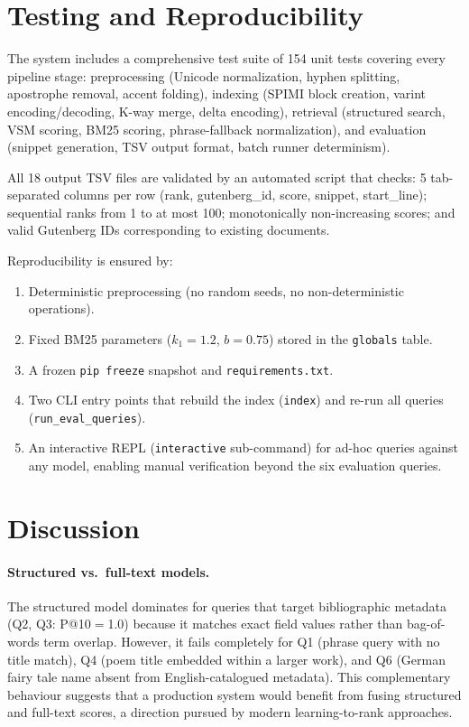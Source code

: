 \documentclass[sigconf,nonacm]{acmart}
\begin{document}
\section{Testing and Reproducibility}

The system includes a comprehensive test suite of 154 unit tests covering
every pipeline stage: preprocessing (Unicode normalization, hyphen splitting,
apostrophe removal, accent folding), indexing (SPIMI block creation, varint
encoding/decoding, K-way merge, delta encoding), retrieval (structured search,
VSM scoring, BM25 scoring, phrase-fallback normalization), and evaluation
(snippet generation, TSV output format, batch runner determinism).

All 18 output TSV files are validated by an automated script that checks:
5 tab-separated columns per row (rank, gutenberg\_id, score, snippet,
start\_line); sequential ranks from 1 to at most 100; monotonically
non-increasing scores; and valid Gutenberg IDs corresponding to existing
documents.

Reproducibility is ensured by:
\begin{enumerate}[nosep]
  \item Deterministic preprocessing (no random seeds, no non-deterministic
        operations).
  \item Fixed BM25 parameters ($k_1{=}1.2$, $b{=}0.75$) stored in
        the \texttt{globals} table.
  \item A frozen \texttt{pip~freeze} snapshot and
        \texttt{requirements.txt}.
  \item Two CLI entry points that rebuild the index
        (\texttt{index}) and re-run all queries
        (\texttt{run\_eval\_queries}).
  \item An interactive REPL (\texttt{interactive} sub-command)
        for ad-hoc queries against any model, enabling manual
        verification beyond the six evaluation queries.
\end{enumerate}

\section{Discussion}

\paragraph{Structured vs.\ full-text models.}
The structured model dominates for queries that target bibliographic metadata
(Q2, Q3: P@10$=$1.0) because it matches exact field values rather than
bag-of-words term overlap.  However, it fails completely for Q1 (phrase query
with no title match), Q4 (poem title embedded within a larger work), and Q6
(German fairy tale name absent from English-catalogued metadata).  This
complementary behaviour suggests that a production system would benefit from
fusing structured and full-text scores, a direction pursued by modern
learning-to-rank approaches.
\end{document}
